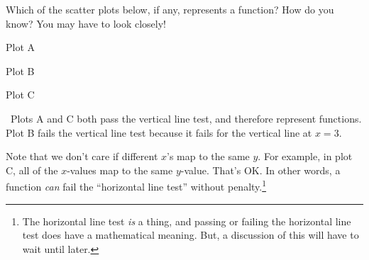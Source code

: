 \begin{boxedex}
Which of the scatter plots below, if any, represents a function? How do you know? You may have to look closely!

\begin{minipage}{0.33\textwidth}
\centering
Plot A
\par{}
\end{minipage}
\begin{minipage}{0.33\textwidth}
\centering
Plot B
\par{}
\end{minipage}
\begin{minipage}{0.33\textwidth}
\centering
Plot C
\par{}
\end{minipage}

\exsoln\ Plots A and C both pass the vertical line test, and therefore represent functions. Plot B fails the vertical line test because it fails for the vertical line at $x=3$.
\end{boxedex}

Note that we don't care if different $x$'s map to the same $y$. For example, in plot C, all of the $x$-values map to the same $y$-value. That's OK. In other words, a function \textit{can} fail the ``horizontal line test'' without penalty.\footnote{The horizontal line test \textit{is} a thing, and passing or failing the horizontal line test does have a mathematical meaning. But, a discussion of this will have to wait until later.}

